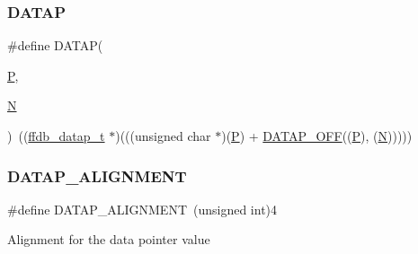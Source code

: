 \subsubsection{\texorpdfstring{DATAP}{DATAP}}
{\footnotesize\ttfamily \#define D\+A\+T\+AP(\begin{DoxyParamCaption}\item[{}]{\mbox{\hyperlink{adat__devel_2lib_2hadron_2operator__name__util_8cc_aef94be98e2c9e4a4dece75f60ca9792c}{P}},  }\item[{}]{\mbox{\hyperlink{adat__devel_2lib_2hadron_2operator__name__util_8cc_a7722c8ecbb62d99aee7ce68b1752f337}{N}} }\end{DoxyParamCaption})~((\mbox{\hyperlink{adat-devel_2other__libs_2filedb_2filehash_2ffdb__page_8h_af1593018f0ec0e6539abbf3de31870e6}{ffdb\+\_\+datap\+\_\+t}} $\ast$)(((unsigned char $\ast$)(\mbox{\hyperlink{adat__devel_2lib_2hadron_2operator__name__util_8cc_aef94be98e2c9e4a4dece75f60ca9792c}{P}}) + \mbox{\hyperlink{adat__devel_2other__libs_2filedb_2filehash_2ffdb__page_8h_a432a107084643e69597e2ea291d7a102}{D\+A\+T\+A\+P\+\_\+\+O\+FF}}((\mbox{\hyperlink{adat__devel_2lib_2hadron_2operator__name__util_8cc_aef94be98e2c9e4a4dece75f60ca9792c}{P}}), (\mbox{\hyperlink{adat__devel_2lib_2hadron_2operator__name__util_8cc_a7722c8ecbb62d99aee7ce68b1752f337}{N}})))))}

\mbox{\label{adat-devel_2other__libs_2filedb_2filehash_2ffdb__page_8h_a442c3bfb4646a5dd8036ddefcc3c0ed6}} 
\subsubsection{\texorpdfstring{DATAP\_ALIGNMENT}{DATAP\_ALIGNMENT}}
{\footnotesize\ttfamily \#define D\+A\+T\+A\+P\+\_\+\+A\+L\+I\+G\+N\+M\+E\+NT~(unsigned int)4}

Alignment for the data pointer value \mbox{\label{adat-devel_2other__libs_2filedb_2filehash_2ffdb__page_8h_a432a107084643e69597e2ea291d7a102}} 

